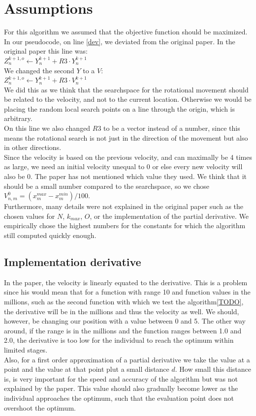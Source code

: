 \documentclass[runningheads]{llncs}
\begin{document}
\newpage
\section{Assumptions}
For this algorithm we assumed that the objective function should be maximized.\\
In our pseudocode, on line \ref{dev}, we deviated from the original paper. In the original paper this line was: \\
$Z_n^{k+1, o} \leftarrow Y_n^{k+1} + R3 \cdot Y_n^{k+1}$ \\
We changed the second $ Y $ to a $V$:\\
$Z_n^{k+1, o} \leftarrow Y_n^{k+1} + R3 \cdot V_n^{k+1}$ \\
We did this as we think that the searchspace for the rotational movement should be related to the velocity, and not to the current location. Otherwise we would be placing the random local search points on a line through the origin, which is arbitrary. \\ %
On this line we also changed $R3$ to be a vector instead of a number, since this means the rotational search is not just in the direction of the movement but also in other directions. \\
Since the velocity is based on the previous velocity, and can maximally be 4 times as large, we need an initial velocity unequal to 0 or else every new velocity will also be 0. The paper has not mentioned which value they used. We think that it should be a small number compared to the searchspace, so we chose $V_{n,m}^0 = (x_m^{max} - x_m^{min})/100$.\\
Furthermore, many details were not explained in the original paper such as the chosen values for $N$, $k_{max}$, $O$, or the implementation of the partial derivative. We empirically chose the highest numbers for the constants for which the algorithm still computed quickly enough.\\

\subsection{Implementation derivative}
In the paper, the velocity is linearly equated to the derivative. This is a problem since his would mean that for a function with range 10 and function values in the millions, such as the second function with which we test the algorithm\ref{TODO}, the derivative will be in the millions and thus the velocity as well. We should, however, be changing our position with a value between 0 and 5. The other way around, if the range is in the millions and the function ranges between 1.0 and 2.0, the derivative is too low for the individual to reach the optimum within limited stages.\\
Also, for a first order approximation of a partial derivative we take the value at a point and the value at that point plut a small distance $d$. How small this distance is, is very important for the speed and accuracy of the algorithm but was not explained by the paper. This value should also gradually become lower as the individual approaches the optimum, such that the evaluation point does not overshoot the optimum.\\
\end{document}
